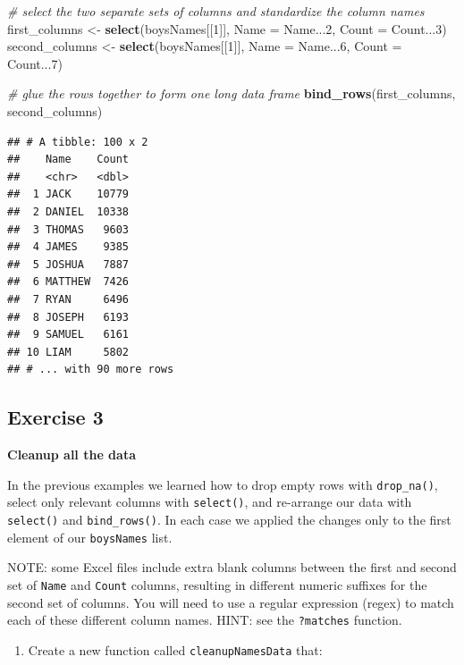 \documentclass[
]{book}
\newenvironment{Shaded}{\begin{snugshade}}{\end{snugshade}}
\newcommand{\CommentTok}[1]{\textcolor[rgb]{0.56,0.35,0.01}{\textit{#1}}}
\newcommand{\DataTypeTok}[1]{\textcolor[rgb]{0.13,0.29,0.53}{#1}}
\newcommand{\DecValTok}[1]{\textcolor[rgb]{0.00,0.00,0.81}{#1}}
\newcommand{\KeywordTok}[1]{\textcolor[rgb]{0.13,0.29,0.53}{\textbf{#1}}}
\newcommand{\NormalTok}[1]{#1}
\newcommand{\StringTok}[1]{\textcolor[rgb]{0.31,0.60,0.02}{#1}}
\providecommand{\tightlist}{%
  \setlength{\itemsep}{0pt}\setlength{\parskip}{0pt}}
\begin{document}
\begin{Shaded}
\begin{Highlighting}[]
\CommentTok{\# select the two separate sets of columns and standardize the column names}
\NormalTok{first\_columns \textless{}{-}}\StringTok{ }\KeywordTok{select}\NormalTok{(boysNames[[}\DecValTok{1}\NormalTok{]], }\DataTypeTok{Name =}\NormalTok{ Name...}\DecValTok{2}\NormalTok{, }\DataTypeTok{Count =}\NormalTok{ Count...}\DecValTok{3}\NormalTok{)}
\NormalTok{second\_columns \textless{}{-}}\StringTok{ }\KeywordTok{select}\NormalTok{(boysNames[[}\DecValTok{1}\NormalTok{]], }\DataTypeTok{Name =}\NormalTok{ Name...}\DecValTok{6}\NormalTok{, }\DataTypeTok{Count =}\NormalTok{ Count...}\DecValTok{7}\NormalTok{)}

\CommentTok{\# glue the rows together to form one long data frame}
\KeywordTok{bind\_rows}\NormalTok{(first\_columns, second\_columns)}
\end{Highlighting}
\end{Shaded}

\begin{verbatim}
## # A tibble: 100 x 2
##    Name    Count
##    <chr>   <dbl>
##  1 JACK    10779
##  2 DANIEL  10338
##  3 THOMAS   9603
##  4 JAMES    9385
##  5 JOSHUA   7887
##  6 MATTHEW  7426
##  7 RYAN     6496
##  8 JOSEPH   6193
##  9 SAMUEL   6161
## 10 LIAM     5802
## # ... with 90 more rows
\end{verbatim}

\hypertarget{exercise-3-3}{%
\subsection{Exercise 3}\label{exercise-3-3}}

\textbf{Cleanup all the data}

In the previous examples we learned how to drop empty rows with \texttt{drop\_na()}, select only relevant columns with \texttt{select()}, and re-arrange our data with \texttt{select()} and \texttt{bind\_rows()}. In each case we applied the changes only to the first element of our \texttt{boysNames} list.

NOTE: some Excel files include extra blank columns between the first and second set of \texttt{Name} and \texttt{Count} columns, resulting in different numeric suffixes for the second set of columns. You will need to use a regular expression (regex) to match each of these different column names. HINT: see the \texttt{?matches} function.

\begin{enumerate}
\def\labelenumi{\arabic{enumi}.}
\tightlist
\item
  Create a new function called \texttt{cleanupNamesData} that:
\end{enumerate}
\end{document}
